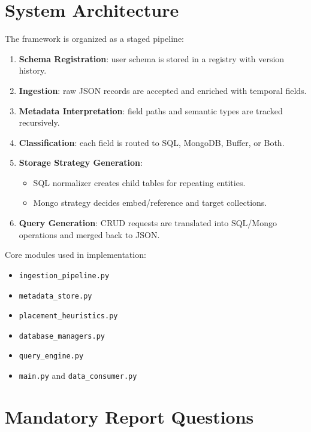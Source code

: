 \documentclass[12pt,a4paper]{article}
\begin{document}
\section{System Architecture}
The framework is organized as a staged pipeline:
\begin{enumerate}[leftmargin=*]
  \item \textbf{Schema Registration}: user schema is stored in a registry with version history.
  \item \textbf{Ingestion}: raw JSON records are accepted and enriched with temporal fields.
  \item \textbf{Metadata Interpretation}: field paths and semantic types are tracked recursively.
  \item \textbf{Classification}: each field is routed to SQL, MongoDB, Buffer, or Both.
  \item \textbf{Storage Strategy Generation}:
  \begin{itemize}[leftmargin=*]
    \item SQL normalizer creates child tables for repeating entities.
    \item Mongo strategy decides embed/reference and target collections.
  \end{itemize}
  \item \textbf{Query Generation}: CRUD requests are translated into SQL/Mongo operations and merged back to JSON.
\end{enumerate}

Core modules used in implementation:
\begin{itemize}[leftmargin=*]
  \item \texttt{ingestion\_pipeline.py}
  \item \texttt{metadata\_store.py}
  \item \texttt{placement\_heuristics.py}
  \item \texttt{database\_managers.py}
  \item \texttt{query\_engine.py}
  \item \texttt{main.py} and \texttt{data\_consumer.py}
\end{itemize}

\section{Mandatory Report Questions}
\end{document}
